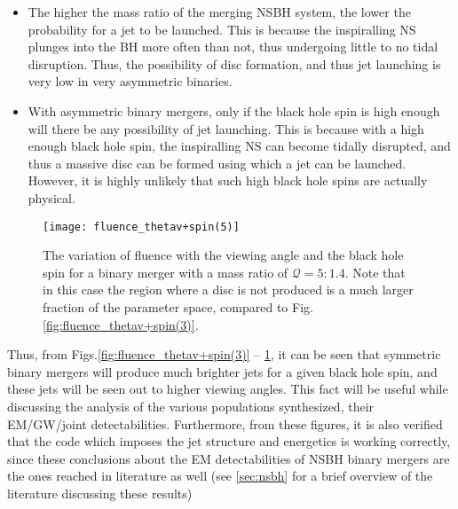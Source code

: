     \begin{itemize}

        \item The higher the mass ratio of the merging NSBH system, the lower the
            probability for a jet to be launched. This is because the inspiralling NS
            plunges into the BH more often than not, thus undergoing little to no tidal
            disruption. Thus, the possibility of disc formation, and thus jet launching
            is very low in very asymmetric binaries.

        \item With asymmetric binary mergers, only if the black hole spin is high enough
            will there be any possibility of jet launching. This is because with a high
            enough black hole spin, the inspiralling NS can become tidally disrupted,
            and thus a massive disc can be formed using which a jet can be launched.
            However, it is highly unlikely that such high black hole spins are actually
            physical.

    \end{itemize}

    \begin{figure}[H]
        \centering
        \texttt{[image: fluence\_thetav+spin(5)]}
        \caption[Variation of $\mathcal{F}(\chi_{BH}, \theta_{v})$ for a
        $\mathcal{Q}=5:1.4$ NSBH binary merger]{
            The variation of fluence with the viewing angle and the black hole spin for
            a binary merger with a mass ratio of $\mathcal{Q}=5:1.4$. Note that in this
            case the region where a disc is not produced is a much larger fraction of
            the parameter space, compared to Fig.\ref{fig:fluence_thetav+spin(3)}.
        }
        \label{fig:fluence_thetav+spin(5)}
    \end{figure}

    Thus, from Figs.\ref{fig:fluence_thetav+spin(3)} --
    \ref{fig:fluence_thetav+spin(5)}, it can be seen that symmetric binary mergers will
    produce much brighter jets for a given black hole spin, and these jets will be seen
    out to higher viewing angles. This fact will be useful while discussing the analysis
    of the various populations synthesized, their EM/GW/joint detectabilities.
    Furthermore, from these figures, it is also verified that the code which imposes the
    jet structure and energetics is working correctly, since these conclusions about the
    EM detectabilities of NSBH binary mergers are the ones reached in literature as
    well (see \ref{sec:nsbh} for a brief overview of the literature discussing
    these results)

